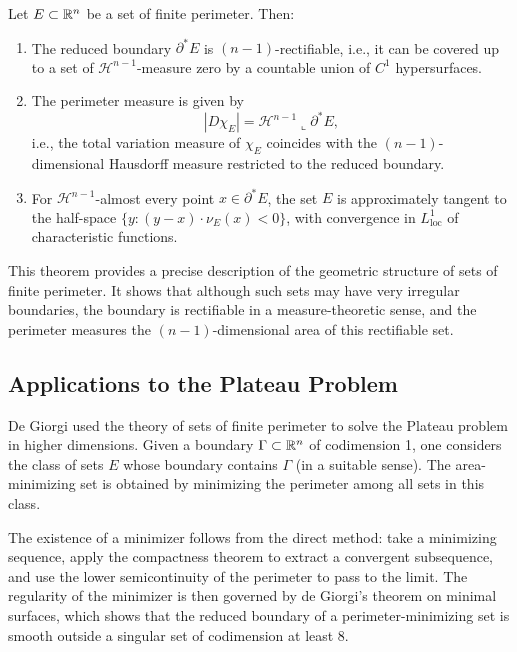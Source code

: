 \begin{theorem}
Let \(E \subset \mathbb{R}^n\) be a set of finite perimeter. Then:
\begin{enumerate}
    \item The reduced boundary \(\partial^* E\) is \((n-1)\)-rectifiable, i.e., it can be covered up to a set of \(\mathcal{H}^{n-1}\)-measure zero by a countable union of \(C^1\) hypersurfaces.
    \item The perimeter measure is given by
    \[
    |D\chi_E| = \mathcal{H}^{n-1} \llcorner \partial^* E,
    \]
    i.e., the total variation measure of \(\chi_E\) coincides with the \((n-1)\)-dimensional Hausdorff measure restricted to the reduced boundary.
    \item For \(\mathcal{H}^{n-1}\)-almost every point \(x \in \partial^* E\), the set \(E\) is approximately tangent to the half-space \(\{y: (y-x) \cdot \nu_E(x) < 0\}\), with convergence in \(L^1_{\mathrm{loc}}\) of characteristic functions.
\end{enumerate}
\end{theorem}

This theorem provides a precise description of the geometric structure of sets of finite perimeter. It shows that although such sets may have very irregular boundaries, the boundary is rectifiable in a measure-theoretic sense, and the perimeter measures the \((n-1)\)-dimensional area of this rectifiable set.

\subsection{Applications to the Plateau Problem}

De Giorgi used the theory of sets of finite perimeter to solve the Plateau problem in higher dimensions. Given a boundary \(\Gamma \subset \mathbb{R}^n\) of codimension 1, one considers the class of sets \(E\) whose boundary contains \(\Gamma\) (in a suitable sense). The area-minimizing set is obtained by minimizing the perimeter among all sets in this class.

The existence of a minimizer follows from the direct method: take a minimizing sequence, apply the compactness theorem to extract a convergent subsequence, and use the lower semicontinuity of the perimeter to pass to the limit. The regularity of the minimizer is then governed by de Giorgi's theorem on minimal surfaces, which shows that the reduced boundary of a perimeter-minimizing set is smooth outside a singular set of codimension at least 8.

